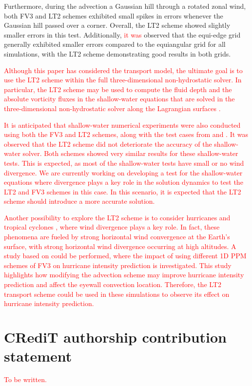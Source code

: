 \documentclass[preprint,12pt]{elsarticle}
\begin{document}
\begin{linenumbers}
Furthermore, during the advection a Gaussian hill through a rotated zonal wind, both FV3 and LT2 schemes exhibited small spikes in errors whenever the Gaussian hill passed over a corner. 
Overall, the LT2 scheme showed slightly smaller errors in this test.
Additionally, \textcolor{red}{it was} observed that the equi-edge grid generally exhibited smaller errors compared to the equiangular grid for all simulations, with the LT2 scheme demonstrating good results in both grids.

\textcolor{red}{
Although this paper has considered the transport model, the ultimate goal is to use the LT2 scheme within the full three-dimensional non-hydrostatic solver. 
In particular, the LT2 scheme may be used to compute the fluid depth and the absolute vorticity fluxes in the shallow-water equations that are solved in the three-dimensional non-hydrostatic solver along the Lagrangian surfaces \cite{lin:2004}.}

\textcolor{red}{
It is anticipated that shallow-water numerical experiments were also conducted using both the FV3 and LT2 schemes, along with the test cases from \cite{will:1992} and \cite{galewsky:2004}. It was observed that the LT2 scheme did not deteriorate the accuracy of the shallow-water solver. 
Both schemes showed very similar results for these shallow-water tests.
This is expected, as most of the shallow-water tests have small or no wind divergence.
We are currently working on developing a test for the shallow-water equations where divergence plays a key role in the solution dynamics to test the LT2 and FV3 schemes in this case.
In this scenario, it is expected that the LT2 scheme should introduce a more accurate solution.
}

\textcolor{red}{
Another possibility to explore the LT2 scheme is to consider hurricanes and tropical cyclones \cite{holton:2012}, where wind divergence plays a key role.
In fact, these phenomena are fueled by strong horizontal
wind convergence at the Earth’s surface, with strong horizontal wind divergence occurring at high altitudes. 
A study based on \cite{gao:2021} could be performed, where the impact of using different 1D PPM schemes of FV3 on hurricane intensity prediction is investigated.
This study highlights how modifying the advection scheme may improve
hurricane intensity prediction and affect the eyewall convection location. 
Therefore, the LT2 transport scheme could be used in these simulations to observe its effect on hurricane intensity prediction.
}


\section*{CRediT authorship contribution statement}
\textcolor{red}{To be written.}


\end{linenumbers}
\end{document}
